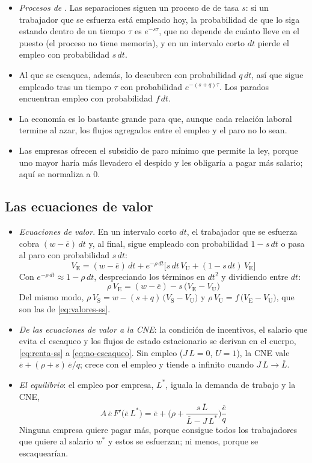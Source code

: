 \documentclass[11pt]{article}
\begin{document}
\begin{itemize}
\item \emph{Procesos de }. Las separaciones siguen un proceso de  de tasa $s$: si un trabajador que se esfuerza está empleado hoy, la probabilidad de que lo siga estando dentro de un tiempo $\tau$ es $e^{-s\tau}$, que no depende de cuánto lleve en el puesto (el proceso no tiene memoria), y en un intervalo corto $dt$ pierde el empleo con probabilidad $s\,dt$.
\item Al que se escaquea, además, lo descubren con probabilidad $q\,dt$, así que sigue empleado tras un tiempo $\tau$ con probabilidad $e^{-(s+q)\tau}$. Los parados encuentran empleo con probabilidad $f\,dt$.
\item La economía es lo bastante grande para que, aunque cada relación laboral termine al azar, los flujos agregados entre el empleo y el paro no lo sean.
\item Las empresas ofrecen el subsidio de paro mínimo que permite la ley, porque uno mayor haría más llevadero el despido y les obligaría a pagar más salario; aquí se normaliza a 0\nocite{ShapiroStiglitz1984Equilibrium}.
\end{itemize}

\subsection{Las ecuaciones de valor}\label{anexo:ss-valores}

\begin{itemize}
\item \emph{Ecuaciones de valor}. En un intervalo corto $dt$, el trabajador que se esfuerza cobra $(w-\overline{e})\,dt$ y, al final, sigue empleado con probabilidad $1-s\,dt$ o pasa al paro con probabilidad $s\,dt$:
  $$V_{\mathrm E}=(w-\overline{e})\,dt+e^{-\rho\,dt}\big[s\,dt\,V_{\mathrm U}+(1-s\,dt)\,V_{\mathrm E}\big]$$
  Con $e^{-\rho\,dt}\approx 1-\rho\,dt$, despreciando los términos en $dt^2$ y dividiendo entre $dt$:
  $$\rho\,V_{\mathrm E}=(w-\overline{e})-s\,\big(V_{\mathrm E}-V_{\mathrm U}\big)$$
  Del mismo modo, $\rho\,V_{\mathrm S}=w-(s+q)\,\big(V_{\mathrm S}-V_{\mathrm U}\big)$ y $\rho\,V_{\mathrm U}=f\,\big(V_{\mathrm E}-V_{\mathrm U}\big)$, que son las de \eqref{eq:valores-ss}.\findemo
\item \emph{De las ecuaciones de valor a la CNE}: la condición de incentivos, el salario que evita el escaqueo y los flujos de estado estacionario se derivan en el cuerpo, \eqref{eq:renta-ss} a \eqref{eq:no-escaqueo}. Sin empleo ($J\,L=0$, $U=1$), la CNE vale $\overline{e}+(\rho+s)\,\overline{e}/q$; crece con el empleo y tiende a infinito cuando $J\,L\to\overline{L}$.
\item \emph{El equilibrio}: el empleo por empresa, $L^*$, iguala la demanda de trabajo y la CNE,
  $$A\,\overline{e}\,F'\big(\overline{e}\,L^*\big)=\overline{e}+\Big(\rho+\frac{s\,\overline{L}}{\overline{L}-J\,L^*}\Big)\frac{\overline{e}}{q}$$
  Ninguna empresa quiere pagar más, porque consigue todos los trabajadores que quiere al salario $w^*$ y estos se esfuerzan; ni menos, porque se escaquearían\nocite{ShapiroStiglitz1984Equilibrium}.
\end{itemize}
\end{document}
